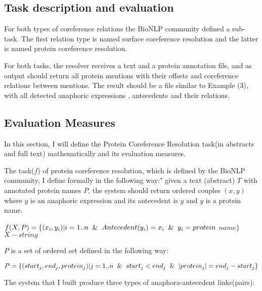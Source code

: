 \subsection{Task description and evaluation}

For both types of coreference relations the BioNLP community defined a sub-task. The first relation type is named surface coreference resolution and the latter is named protein coreference resolution.

For both tasks, the resolver receives a text and a protein annotation file, and as output should return all protein mentions with their offsets and coreference relations between mentions. The result should be a file similar to Example (3), with all detected anaphoric expressions , antecedents and their relations. 

\subsection{Evaluation Measures}

In this section, I will define the Protein Coreference Resolution task(in abstracts and full text) mathematically and its evaluation measures.

The task($f$) of protein coreference resolution, which is defined by the BioNLP community, I define formally in the following way:" given a text (abstract) $T$ with annotated protein names $P$, the system should return ordered couples $(x, y)$ where $y$
is an anaphoric expression and its antecedent is $y$ and  $y$ is a protein name.\\
\begin{center}
  $f(X,P)=\{(x_i,y_i) |i=1..n \And Antecedent(y_i)=x_i \And y_i= protein$  $name\}$ \\
  $X-string$ \\
\end{center}

$P$ is a set of ordered set defined in the following way:\\
\begin{center}
    $P= \{(start_j, end_j, protein_j)| j=1..n \And start_j< end_j \And |protein_j|= end_j-start_j\}$\\
\end{center}
 
The system that I built produce three types of anaphora-antecedent links(pairs):


